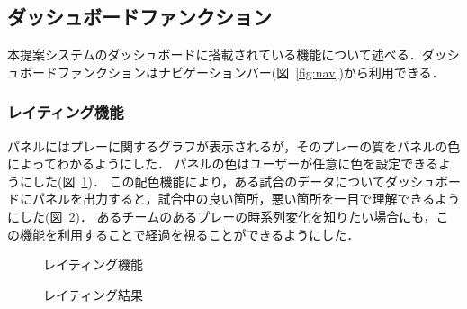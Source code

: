 \documentclass[sotsuron]{kuee}
\begin{document}
		\subsection{ダッシュボードファンクション}
			本提案システムのダッシュボードに搭載されている機能について述べる．ダッシュボードファンクションはナビゲーションバー(図~\ref{fig:nav})から利用できる．
			\subsubsection{レイティング機能}
				パネルにはプレーに関するグラフが表示されるが，そのプレーの質をパネルの色によってわかるようにした．
				パネルの色はユーザーが任意に色を設定できるようにした(図~\ref{fig:rate_config})．
				この配色機能により，ある試合のデータについてダッシュボードにパネルを出力すると，試合中の良い箇所，悪い箇所を一目で理解できるようにした(図~\ref{fig:rated})．
				あるチームのあるプレーの時系列変化を知りたい場合にも，この機能を利用することで経過を視ることができるようにした．
					\begin{figure}
						\begin{center}
						\end{center}
						\caption{レイティング機能}
				  		\label{fig:rate_config}
					\end{figure}
					\begin{figure}
						\begin{center}
						\end{center}
						\caption{レイティング結果}
				  		\label{fig:rated}
					\end{figure}					
\end{document}
